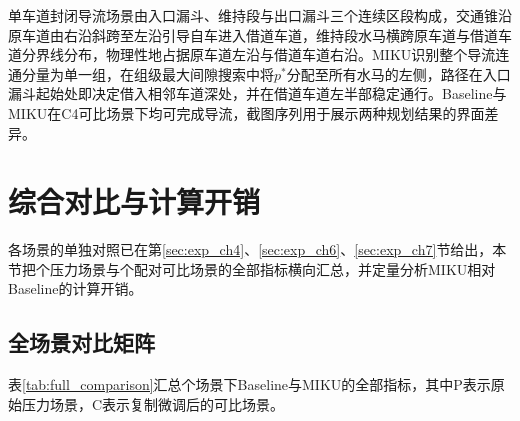 单车道封闭导流场景由入口漏斗、维持段与出口漏斗三个连续区段构成，交通锥沿原车道由右沿斜跨至左沿引导自车进入借道车道，维持段水马横跨原车道与借道车道分界线分布，物理性地占据原车道左沿与借道车道右沿。MIKU识别整个导流连通分量为单一组，在组级最大间隙搜索中将$p^{*}$分配至所有水马的左侧，路径在入口漏斗起始处即决定借入相邻车道深处，并在借道车道左半部稳定通行。Baseline与MIKU在C4可比场景下均可完成导流，截图序列用于展示两种规划结果的界面差异。

\section{综合对比与计算开销}
\label{sec:comprehensive_comparison}

各场景的单独对照已在第\ref{sec:exp_ch4}、\ref{sec:exp_ch6}、\ref{sec:exp_ch7}节给出，本节把\MPressureScenarioTotal{}个压力场景与\MComparableScenarioTotal{}个配对可比场景的全部指标横向汇总，并定量分析MIKU相对Baseline的计算开销。

\subsection{全场景对比矩阵}

表\ref{tab:full_comparison}汇总\MScenarioTotal{}个场景下Baseline与MIKU的全部指标，其中P表示原始压力场景，C表示复制微调后的可比场景。

